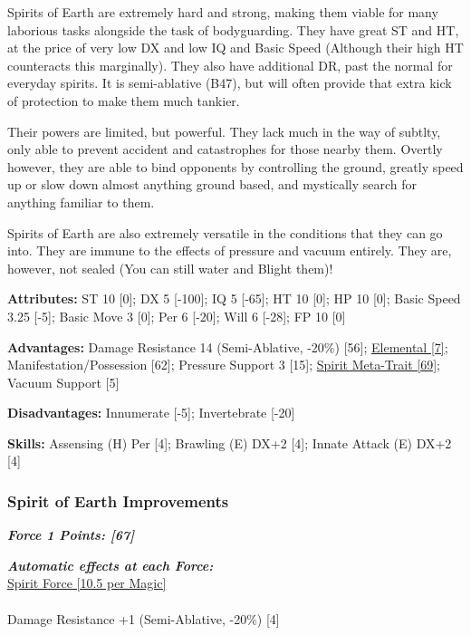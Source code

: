 \begin{multicols*}{3}
	Spirits of Earth are extremely hard and strong, making them viable for many laborious tasks alongside the task of bodyguarding. They have great ST and HT, at the price of very low DX and low IQ and Basic Speed (Although their high HT counteracts this marginally). They also have additional DR, past the normal for everyday spirits. It is semi-ablative (B47), but will often provide that extra kick of protection to make them much tankier.
	
	Their powers are limited, but powerful. They lack much in the way of subtlty, only able to prevent accident and catastrophes for those nearby them. Overtly however, they are able to bind opponents by controlling the ground, greatly speed up or slow down almost anything ground based, and mystically search for anything familiar to them.
	
	Spirits of Earth are also extremely versatile in the conditions that they can go into. They are immune to the effects of pressure and vacuum entirely. They are, however, not sealed (You can still water and Blight them)!
	
	\textbf{Attributes:}
	ST 10 [0]; DX 5 [-100]; IQ 5 [-65]; HT 10 [0]; HP 10 [0]; Basic Speed 3.25 [-5]; Basic Move 3 [0]; Per 6 [-20]; Will 6 [-28]; FP 10 [0]
	
	\textbf{Advantages:}
	Damage Resistance 14 (Semi-Ablative, -20\%) [56]; \hyperref[elemental]{Elemental [7]}; Manifestation/Possession [62]; Pressure Support 3 [15]; \hyperref[spirit_meta_trait]{Spirit Meta-Trait [69]}; Vacuum Support [5]
	
	\textbf{Disadvantages:}
	Innumerate [-5]; Invertebrate [-20]
	
	\textbf{Skills:}
	Assensing (H) Per [4]; Brawling (E) DX+2 [4]; Innate Attack (E) DX+2 [4]
	
	\subsubsection*{Spirit of Earth Improvements}
	
	\textbf{\textit{Force 1 Points: [67]}}
	
	\textbf{\textit{Automatic effects at each Force:\\}}
	\hyperref[spirit_force]{Spirit Force [10.5 per Magic]}\\\\
	Damage Resistance +1 (Semi-Ablative, -20\%) [4]
	

\end{multicols*}
